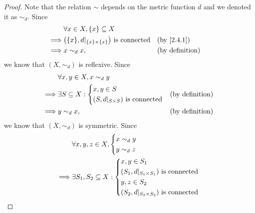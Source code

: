 \begin{proof}
  Note that the relation \(\sim\) depends on the metric function \(d\) and we denoted it as \(\sim_d\).
  Since
  \begin{align*}
             & \forall x \in X, \{x\} \subseteq X                                                        \\
    \implies & \big(\{x\}, d|_{\{x\} \times \{x\}}\big) \text{ is connected} &  & \by{2.4.1}             \\
    \implies & x \sim_d x,                                                   &  & \text{(by definition)}
  \end{align*}
  we know that \((X, \sim_d)\) is reflexive.
  Since
  \begin{align*}
             & \forall x, y \in X, x \sim_d y                                        \\
    \implies & \exists S \subseteq X : \begin{dcases}
                                         x, y \in S \\
                                         (S, d|_{S \times S}) \text{ is connected}
                                       \end{dcases} &  & \text{(by definition)}      \\
    \implies & y \sim_d x,                               &  & \text{(by definition)}
  \end{align*}
  we know that \((X, \sim_d)\) is symmetric.
  Since
  \begin{align*}
             & \forall x, y, z \in X, \begin{dcases}
                                        x \sim_d y \\
                                        y \sim_d z
                                      \end{dcases}                                                                                                     \\
    \implies & \exists S_1, S_2 \subseteq X : \begin{dcases}
                                                x, y \in S_1                                    \\
                                                (S_1, d|_{S_1 \times S_1}) \text{ is connected} \\
                                                y, z \in S_2                                    \\
                                                (S_2, d|_{S_2 \times S_2}) \text{ is connected}

\end{dcases}
\end{align*}
\end{proof}
